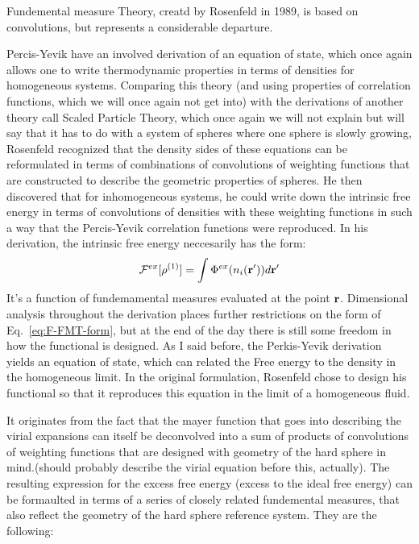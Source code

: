 Fundemental measure Theory, creatd by Rosenfeld in 1989, is based on
convolutions, but represents a considerable departure.

Percis-Yevik have an involved derivation of an equation of state,
which once again allows one to write thermodynamic properties in terms
of densities for homogeneous systems.  Comparing this theory (and
using properties of correlation functions, which we will once again
not get into) with the derivations of another theory call Scaled
Particle Theory, which once again we will not explain but will say
that it has to do with a system of spheres where one sphere is slowly
growing, Rosenfeld recognized that the density sides of these
equations can be reformulated in terms of combinations of convolutions
of weighting functions that are constructed to describe the geometric
properties of spheres.  He then discovered that for inhomogeneous
systems, he could write down the intrinsic free energy in terms of
convolutions of densities with these weighting functions in such a way
that the Percis-Yevik correlation functions were reproduced.  In his
derivation, the intrinsic free energy neccesarily has the form:
\begin{align}
  \label{eq:F-FMT-form}
  \mathcal{F}^{ex}[\rho^{(1)}] = \int \Phi^{ex}({n_i(\textbf{r}')})d\textbf{r}'
\end{align}
It's a function of fundemamental measures evaluated at the point
$\textbf{r}$.  Dimensional analysis throughout the derivation places further
restrictions on the form of Eq.~\ref{eq:F-FMT-form}, but at the end of
the day there is still some freedom in how the functional is designed.
As I said before, the Perkis-Yevik derivation yields an equation of
state, which can related the Free energy to the density in the
homogeneous limit.  In the original formulation, Rosenfeld chose to
design his functional so that it reproduces this equation in the limit
of a homogeneous fluid.

 It originates
from the fact that the mayer function that goes into describing the
virial expansions can itself be deconvolved into a sum of products of
convolutions of weighting functions that are designed with geometry of
the hard sphere in mind.(should probably describe the virial equation
before this, actually).  The resulting expression for the excess free
energy (excess to the ideal free energy) can be formaulted in terms of
a series of closely related fundemental measures, that also reflect
the geometry of the hard sphere reference system.  They are the
following:

